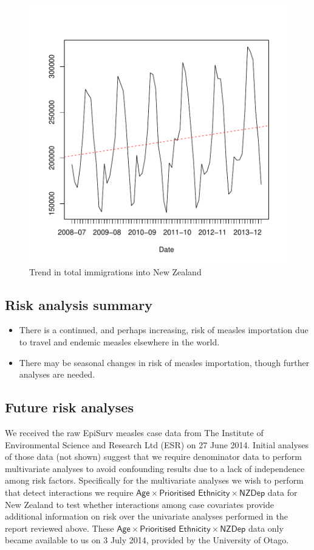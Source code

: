 \documentclass{article}
\begin{document}
\begin{figure}[h!]
\begin{center}
\includegraphics{interimreport1-012}
\end{center}
\caption{Trend in total immigrations into New Zealand}
\label{fig:trendimmigration}
\end{figure}

\subsection{Risk analysis summary}
\begin{itemize}
\item There is a continued, and perhaps increasing, risk of measles importation due to travel and endemic measles elsewhere in the world.
\item There may be seasonal changes in risk of measles importation, though further analyses are needed.
\end{itemize}

\subsection{Future risk analyses}
We received the raw EpiSurv measles case data from The Institute of Environmental Science and Research Ltd (ESR) on 27 June 2014. Initial analyses of those data (not shown) suggest that we require denominator data to perform multivariate analyses to avoid confounding results due to a lack of independence among risk factors. Specifically for the multivariate analyses we wish to perform that detect interactions we require $\textsf{Age} \times \textsf{Prioritised Ethnicity} \times \textsf{NZDep}$ data for New Zealand to test whether interactions among case covariates provide additional information on risk over the univariate analyses performed in the report reviewed above. These $\textsf{Age} \times \textsf{Prioritised Ethnicity} \times \textsf{NZDep}$ data only became available to us on 3 July 2014, provided by the University of Otago.
\end{document}
